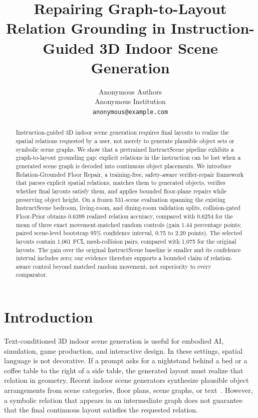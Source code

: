 \documentclass{article}
\title{Repairing Graph-to-Layout Relation Grounding in Instruction-Guided 3D Indoor Scene Generation}
\author{
  Anonymous Authors \\
  Anonymous Institution \\
  \texttt{anonymous@example.com}
}
\newcommand{\method}{Relation-Grounded Floor Repair}
\newcommand{\fp}{Floor-Prior}
\begin{document}
\maketitle

\begin{abstract}
Instruction-guided 3D indoor scene generation requires final layouts to realize the spatial relations requested by a user, not merely to generate plausible object sets or symbolic scene graphs. We show that a pretrained InstructScene pipeline exhibits a graph-to-layout grounding gap: explicit relations in the instruction can be lost when a generated scene graph is decoded into continuous object placements. We introduce \method, a training-free, safety-aware verifier-repair framework that parses explicit spatial relations, matches them to generated objects, verifies whether final layouts satisfy them, and applies bounded floor-plane repairs while preserving object height. On a frozen 531-scene evaluation spanning the existing InstructScene bedroom, living-room, and dining-room validation splits, collision-gated \fp{} obtains 0.6399 realized relation accuracy, compared with 0.6254 for the mean of three exact movement-matched random controls (gain 1.44 percentage points; paired scene-level bootstrap 95\% confidence interval, 0.75 to 2.20 points). The selected layouts contain 1,061 FCL mesh-collision pairs, compared with 1,075 for the original layouts. The gain over the original InstructScene baseline is smaller and its confidence interval includes zero; our evidence therefore supports a bounded claim of relation-aware control beyond matched random movement, not superiority to every comparator.
\end{abstract}

\section{Introduction}

Text-conditioned 3D indoor scene generation is useful for embodied AI, simulation, game production, and interactive design. In these settings, spatial language is not decorative. If a prompt asks for a nightstand behind a bed or a coffee table to the right of a side table, the generated layout must realize that relation in geometry. Recent indoor scene generators synthesize plausible object arrangements from scene categories, floor plans, scene graphs, or text~\citep{paschalidou2021atiss,wang2021sceneformer,tang2024diffuscene,lin2024instructscene}. However, a symbolic relation that appears in an intermediate graph does not guarantee that the final continuous layout satisfies the requested relation.
\end{document}
